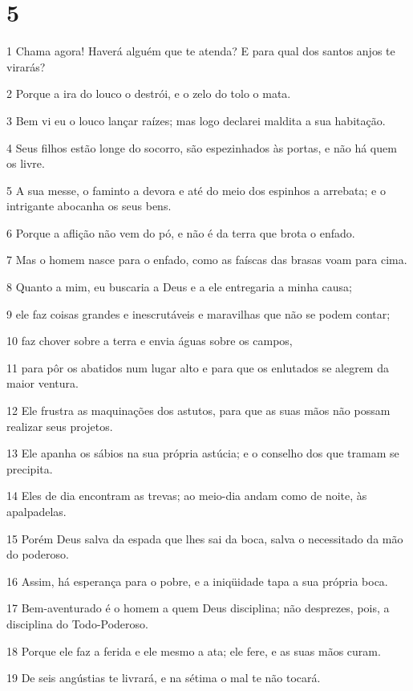 \chapter{5}

\par 1 Chama agora! Haverá alguém que te atenda? E para qual dos santos anjos te virarás?
\par 2 Porque a ira do louco o destrói, e o zelo do tolo o mata.
\par 3 Bem vi eu o louco lançar raízes; mas logo declarei maldita a sua habitação.
\par 4 Seus filhos estão longe do socorro, são espezinhados às portas, e não há quem os livre.
\par 5 A sua messe, o faminto a devora e até do meio dos espinhos a arrebata; e o intrigante abocanha os seus bens.
\par 6 Porque a aflição não vem do pó, e não é da terra que brota o enfado.
\par 7 Mas o homem nasce para o enfado, como as faíscas das brasas voam para cima.
\par 8 Quanto a mim, eu buscaria a Deus e a ele entregaria a minha causa;
\par 9 ele faz coisas grandes e inescrutáveis e maravilhas que não se podem contar;
\par 10 faz chover sobre a terra e envia águas sobre os campos,
\par 11 para pôr os abatidos num lugar alto e para que os enlutados se alegrem da maior ventura.
\par 12 Ele frustra as maquinações dos astutos, para que as suas mãos não possam realizar seus projetos.
\par 13 Ele apanha os sábios na sua própria astúcia; e o conselho dos que tramam se precipita.
\par 14 Eles de dia encontram as trevas; ao meio-dia andam como de noite, às apalpadelas.
\par 15 Porém Deus salva da espada que lhes sai da boca, salva o necessitado da mão do poderoso.
\par 16 Assim, há esperança para o pobre, e a iniqüidade tapa a sua própria boca.
\par 17 Bem-aventurado é o homem a quem Deus disciplina; não desprezes, pois, a disciplina do Todo-Poderoso.
\par 18 Porque ele faz a ferida e ele mesmo a ata; ele fere, e as suas mãos curam.
\par 19 De seis angústias te livrará, e na sétima o mal te não tocará.
